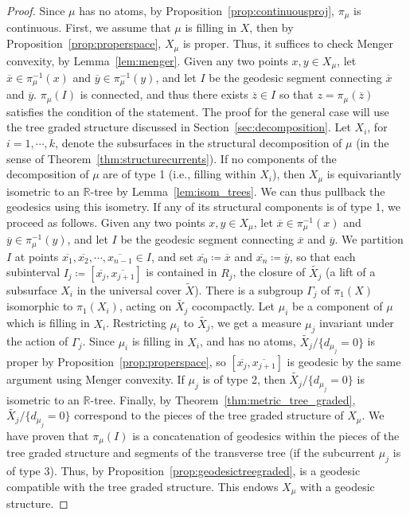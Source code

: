 \documentclass[12pt,article]{amsart}
\numberwithin{equation}{section}
\numberwithin{figure}{section}
\theoremstyle{definition}
\theoremstyle{plain}
\newcommand*{\wt}[1]{\widetilde{#1}}
\begin{document}
\begin{proof}
Since $\mu$ has no atoms, by Proposition~\ref{prop:continuousproj}, $\pi_{\mu}$ is continuous.
First, we assume that $\mu$ is filling in $X$, then by Proposition~\ref{prop:properspace}, 
$X_{\mu}$ is proper. Thus, it suffices to check Menger convexity, by Lemma~\ref{lem:menger}. 
Given any two points $x,y \in X_{\mu}$, let $\overline{x} \in \pi_{\mu}^{-1}(x)$ and $\overline{y} \in \pi_{\mu}^{-1}(y)$, and let $I$ be the geodesic segment connecting $\overline{x}$ and $\overline{y}$. $\pi_{\mu}(I)$ is connected, and thus there exists $\overline{z} \in I$ so that $z=\pi_{\mu}(\overline{z})$ satisfies the condition of the statement.
The proof for the general case will use the tree graded structure discussed in Section~\ref{sec:decomposition}.
Let $X_i$, for $i=1,\cdots,k$, denote the subsurfaces in the structural decomposition of $\mu$ (in the sense of Theorem~\ref{thm:structurecurrents}).
If no components of the decomposition of $\mu$ are of type 1 (i.e., filling within $X_i$), then $X_{\mu}$ is equivariantly isometric to an $\mathbb{R}$-tree by Lemma~\ref{lem:isom_trees}. We can thus pullback the geodesics using this isometry.
If any of its structural components is of type 1, we proceed as follows.
Given any two points $x,y \in X_{\mu}$, let $\overline{x} \in \pi_{\mu}^{-1}(x)$ and $\overline{y} \in \pi_{\mu}^{-1}(y)$, and let $I$ be the geodesic segment connecting $\overline{x}$ and $\overline{y}$. We partition $I$ at points $\overline{x_1}, \overline{x_2}, \cdots, \overline{x_{n-1}} \in I$, and set $\overline{x_0} \coloneqq \overline{x}$ and $\overline{x_n} \coloneqq \overline{y}$, so that each subinterval $I_j \coloneqq [\overline{x_j}, \overline{x_{j+1}}]$ is contained in $R_j$, the closure of $\wt{X_j}$ (a lift of a subsurface $X_i$ in the universal cover $\wt{X}$).
There is a subgroup $\Gamma_j$ of $\pi_1(X)$ isomorphic to $\pi_1(X_i)$, acting on $\wt{X_j}$ cocompactly. 
Let $\mu_i$ be a component of $\mu$ which is filling in $X_i$.
Restricting $\mu_i$ to $\wt{X_j}$, we get a measure $\mu_j$ invariant under the action of $\Gamma_j$. Since $\mu_i$ is filling in $X_i$, and has no atoms, $\wt{X_j}/\{d_{\mu_j}=0\}$ is proper by Proposition~\ref{prop:properspace}, so $[\overline{x_j},\overline{x_{j+1}}]$ is geodesic by the same argument using Menger convexity.
If $\mu_j$ is of type 2, then $\wt{X_j}/\{d_{\mu_j}=0\}$ is isometric to an $\mathbb{R}$-tree.
Finally, by Theorem~\ref{thm:metric_tree_graded}, $\wt{X_j}/\{d_{\mu_j}=0\}$ correspond to the pieces of the tree graded structure of $X_{\mu}$. We have proven that $\pi_{\mu}(I)$ is a concatenation of geodesics within the pieces of the tree graded structure and segments of the transverse tree (if the subcurrent $\mu_j$ is of type 3).
Thus, by Proposition~\ref{prop:geodesictreegraded}, is a geodesic compatible with the tree graded structure. This endows $X_{\mu}$ with a geodesic structure.
\end{proof}
\end{document}
